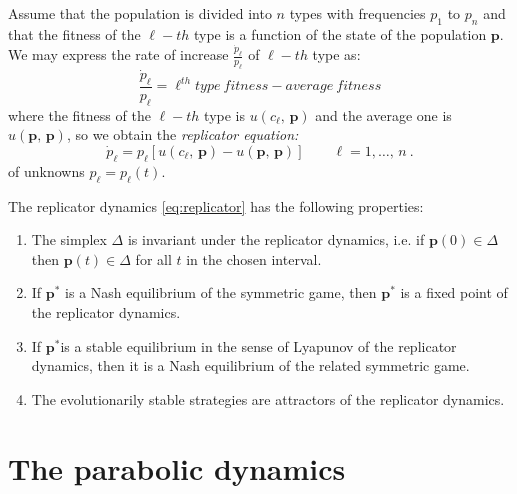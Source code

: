 Assume that the population is divided into $n$ types with frequencies
$p_{1}$ to $p_{n}$ and that the fitness of the $\ell-th$ type is
a function of the state of the population $\mathbf{p}$. We may express
the rate of increase $\frac{\dot{p}_{\ell}}{p_{\ell}}$ of $\ell-th$
type as:
\[
\frac{\dot{p}_{\ell}}{p_{\ell}}=\ell^{th}type\ fitness-average\ fitness
\]
where the fitness of the $\ell-th$ type is $u\left(c_{\ell},\,\mathbf{p}\right)$
and the average one is $u\left(\mathbf{p},\,\mathbf{p}\right)$, so
we obtain the \textit{replicator equation:}
\begin{equation}
\dot{p}_{\ell}=p_{\ell}\left[u\left(c_{\ell},\,\mathbf{p}\right)-u\left(\mathbf{p},\,\mathbf{p}\right)\right]\qquad\ell=1,\ldots,\,n\ .\label{eq:replicator}
\end{equation}
of unknowns $p_{\ell}=p_{\ell}\left(t\right)$.
\begin{thm}
The replicator dynamics \ref{eq:replicator} has the following properties:
\begin{enumerate}
\item The simplex $\Delta$ is invariant under the replicator dynamics,
i.e. if $\mathbf{p}\left(0\right)\in\Delta$ then $\mathbf{p}\left(t\right)\in\Delta$
for all $t$ in the chosen interval.
\item If $\mathbf{p}^{*}$ is a Nash equilibrium of the symmetric game,
then $\mathbf{p}^{*}$ is a fixed point of the replicator dynamics. 
\item If $\mathbf{p}^{*}$is a stable equilibrium in the sense of Lyapunov
of the replicator dynamics, then it is a Nash equilibrium of the related
symmetric game.
\item The evolutionarily stable strategies are attractors of the replicator
dynamics.
\end{enumerate}
\end{thm}


\section{The parabolic dynamics\label{sec:Parabolic-dynamic}}


